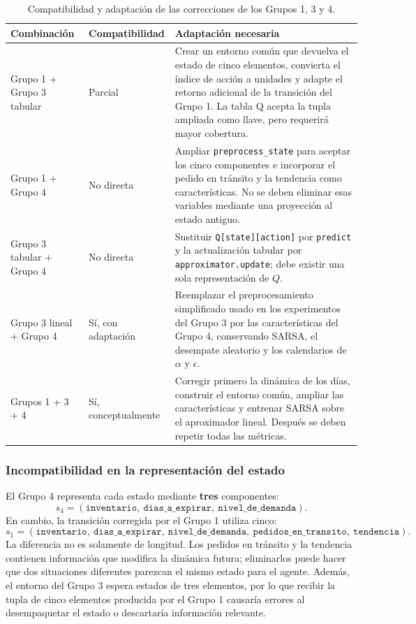 \documentclass[11pt,letterpaper]{article}
\begin{document}
\begin{table}[h]
\centering
\small
\begin{tabular}{p{2.9cm}p{3.0cm}p{8.8cm}}
\toprule
\textbf{Combinación} & \textbf{Compatibilidad} & \textbf{Adaptación necesaria} \\
\midrule
Grupo 1 + Grupo 3 tabular & Parcial & Crear un entorno común que devuelva
el estado de cinco elementos, convierta el índice de acción a unidades y adapte
el retorno adicional de la transición del Grupo 1. La tabla Q acepta la tupla
ampliada como llave, pero requerirá mayor cobertura. \\
\addlinespace
Grupo 1 + Grupo 4 & No directa & Ampliar \texttt{preprocess\_state} para
aceptar los cinco componentes e incorporar el pedido en tránsito y la tendencia
como características. No se deben eliminar esas variables mediante una
proyección al estado antiguo. \\
\addlinespace
Grupo 3 tabular + Grupo 4 & No directa & Sustituir
\texttt{Q[state][action]} por \texttt{predict} y la actualización tabular por
\texttt{approximator.update}; debe existir una sola representación de $Q$. \\
\addlinespace
Grupo 3 lineal + Grupo 4 & Sí, con adaptación & Reemplazar el preprocesamiento
simplificado usado en los experimentos del Grupo 3 por las características del
Grupo 4, conservando SARSA, el desempate aleatorio y los calendarios de
$\alpha$ y $\epsilon$. \\
\addlinespace
Grupos 1 + 3 + 4 & Sí, conceptualmente & Corregir primero la dinámica de los
días, construir el entorno común, ampliar las características y entrenar SARSA
sobre el aproximador lineal. Después se deben repetir todas las métricas. \\
\bottomrule
\end{tabular}
\caption{Compatibilidad y adaptación de las correcciones de los Grupos 1, 3 y 4.}
\label{tab:compatibilidad-integracion}
\end{table}

\subsubsection*{Incompatibilidad en la representación del estado}

El Grupo 4 representa cada estado mediante \textbf{tres} componentes:
\[
  s_4=(\texttt{inventario},\ \texttt{dias\_a\_expirar},\
       \texttt{nivel\_de\_demanda}).
\]
En cambio, la transición corregida por el Grupo 1 utiliza cinco:
\[
  s_1=(\texttt{inventario},\ \texttt{dias\_a\_expirar},\
       \texttt{nivel\_de\_demanda},\ \texttt{pedidos\_en\_transito},\
       \texttt{tendencia}).
\]
La diferencia no es solamente de longitud. Los pedidos en tránsito y la tendencia
contienen información que modifica la dinámica futura; eliminarlos puede hacer que
dos situaciones diferentes parezcan el mismo estado para el agente. Además, el
entorno del Grupo 3 espera estados de tres elementos, por lo que recibir la tupla
de cinco elementos producida por el Grupo 1 causaría errores al desempaquetar el
estado o descartaría información relevante.
\end{document}
